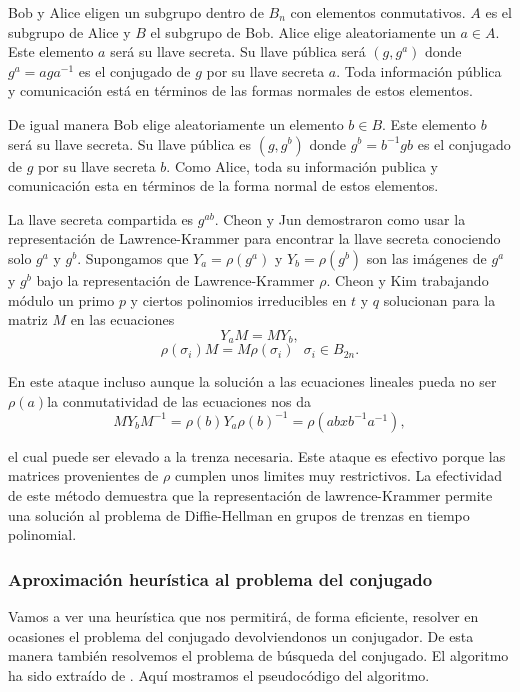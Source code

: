 \documentclass[12pt]{article}
\theoremstyle{definition}
\begin{document}
Bob y Alice eligen un subgrupo dentro de $B_n$ con elementos conmutativos. $A$ es el subgrupo de Alice y $B$ el subgrupo de Bob. Alice elige aleatoriamente un $a\in A$. Este elemento $a$ será su llave secreta. Su llave pública será $(g,g^a)$ donde $g^a=aga^{-1}$ es el conjugado de $g$ por su llave secreta $a$. Toda información pública y comunicación está en términos de las formas normales de estos elementos.

De igual manera Bob elige aleatoriamente un elemento $b\in B$. Este elemento $b$ será su llave secreta. Su llave pública es $(g,g^b)$ donde $g^b = b^{-1}gb$ es el conjugado de $g$ por su llave secreta $b$. Como Alice, toda su información publica y comunicación esta en términos de la forma normal de estos elementos.

La llave secreta compartida es $g^{ab}$. Cheon y Jun demostraron como usar la representación de Lawrence-Krammer para encontrar la llave secreta conociendo solo $g^a$ y $g^b$. Supongamos que $Y_a=\rho(g^a)$ y  $Y_b=\rho(g^b)$ son las imágenes de $g^a$ y $g^b$ bajo la representación de Lawrence-Krammer $\rho$. Cheon y Kim trabajando módulo un primo $p$ y ciertos polinomios irreducibles en $t$ y $q$ solucionan para la matriz $M$ en las ecuaciones
$$Y_aM=MY_b,$$
$$\rho(\sigma_i)M=M\rho(\sigma_i)\ \ \ \sigma_i\in B_{2n}.$$

En este ataque incluso aunque la solución a las ecuaciones lineales pueda no ser $\rho(a)$la conmutatividad de las ecuaciones nos da
$$MY_bM^{-1}=\rho(b)Y_a\rho(b)^{-1}=\rho(abxb^{-1}a^{-1}),$$

el cual puede ser elevado a la trenza necesaria. Este ataque es efectivo porque las matrices provenientes de $\rho$ cumplen unos limites muy restrictivos. La efectividad de este método demuestra que la representación de lawrence-Krammer permite una solución al problema de Diffie-Hellman en grupos de trenzas en tiempo polinomial.

\subsubsection{Aproximación heurística al problema del conjugado}
Vamos a ver una heurística que nos permitirá, de forma eficiente, resolver en ocasiones el problema del conjugado devolviendonos un conjugador. De esta manera también resolvemos el problema de búsqueda del conjugado. El algoritmo ha sido extraído de \cite{Att}. Aquí mostramos el pseudocódigo del algoritmo.
\newline
\end{document}
